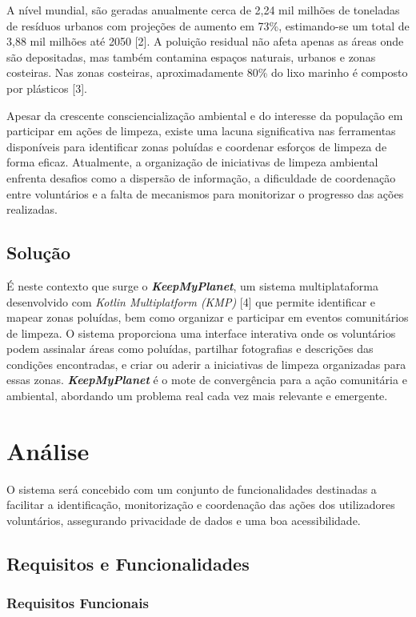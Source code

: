 \documentclass[a4paper,11pt]{article}
\begin{document}
A nível mundial, são geradas anualmente cerca de 2,24 mil milhões de toneladas de resíduos urbanos com projeções de aumento em 73\%, estimando-se um total de 3,88 mil milhões até 2050 [2]. A poluição residual não afeta apenas as áreas onde são depositadas, mas também contamina espaços naturais, urbanos e zonas costeiras.
Nas zonas costeiras, aproximadamente 80\% do lixo marinho é composto por plásticos [3].

Apesar da crescente consciencialização ambiental e do interesse da população em participar em ações de limpeza, existe uma lacuna significativa nas ferramentas disponíveis para identificar zonas poluídas e coordenar esforços de limpeza de forma eficaz. Atualmente, a organização de iniciativas de limpeza ambiental enfrenta desafios como a dispersão de informação, a dificuldade de coordenação entre voluntários e a falta de mecanismos para monitorizar o progresso das ações realizadas.

\subsection{Solução}
É neste contexto que surge o \textit{\textbf{KeepMyPlanet}}, um sistema multiplataforma desenvolvido com \textit{Kotlin Multiplatform (KMP)} [4] que permite identificar e mapear zonas poluídas, bem como organizar e participar em eventos comunitários de limpeza. O sistema proporciona uma interface interativa onde os voluntários podem assinalar áreas como poluídas, partilhar fotografias e descrições das condições encontradas, e criar ou aderir a iniciativas de limpeza organizadas para essas zonas.
\textit{\textbf{KeepMyPlanet}} é o mote de convergência para a ação comunitária e ambiental, abordando um problema real cada vez mais relevante e emergente.

\section{Análise}
O sistema será concebido com um conjunto de funcionalidades destinadas a facilitar a identificação, monitorização e coordenação das ações dos utilizadores voluntários, assegurando privacidade de dados e uma boa acessibilidade.

\subsection{Requisitos e Funcionalidades}
\subsubsection{Requisitos Funcionais}
\end{document}
